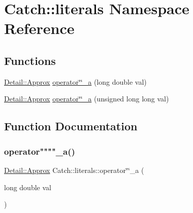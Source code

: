 \hypertarget{namespace_catch_1_1literals}{}\section{Catch\+::literals Namespace Reference}
\label{namespace_catch_1_1literals}
\subsection*{Functions}
\begin{DoxyCompactItemize}
\item 
\mbox{\hyperlink{class_catch_1_1_detail_1_1_approx}{Detail\+::\+Approx}} \mbox{\hyperlink{namespace_catch_1_1literals_aed9bf4d544c60a074440a055a54ea6c3}{operator\char`\"{}\char`\"{}\+\_\+a}} (long double val)
\item 
\mbox{\hyperlink{class_catch_1_1_detail_1_1_approx}{Detail\+::\+Approx}} \mbox{\hyperlink{namespace_catch_1_1literals_aded81112b3a271a8b9538dff17acd093}{operator\char`\"{}\char`\"{}\+\_\+a}} (unsigned long long val)
\end{DoxyCompactItemize}


\subsection{Function Documentation}
\mbox{\label{namespace_catch_1_1literals_aed9bf4d544c60a074440a055a54ea6c3}} 
\subsubsection{\texorpdfstring{operator""""\_a()}{operator""\_a()}\hspace{0.1cm}{\footnotesize\ttfamily [1/2]}}
{\footnotesize\ttfamily \mbox{\hyperlink{class_catch_1_1_detail_1_1_approx}{Detail\+::\+Approx}} Catch\+::literals\+::operator\char`\"{}\char`\"{}\+\_\+a (\begin{DoxyParamCaption}\item[{long double}]{val }\end{DoxyParamCaption})}

\mbox{\label{namespace_catch_1_1literals_aded81112b3a271a8b9538dff17acd093}} 
